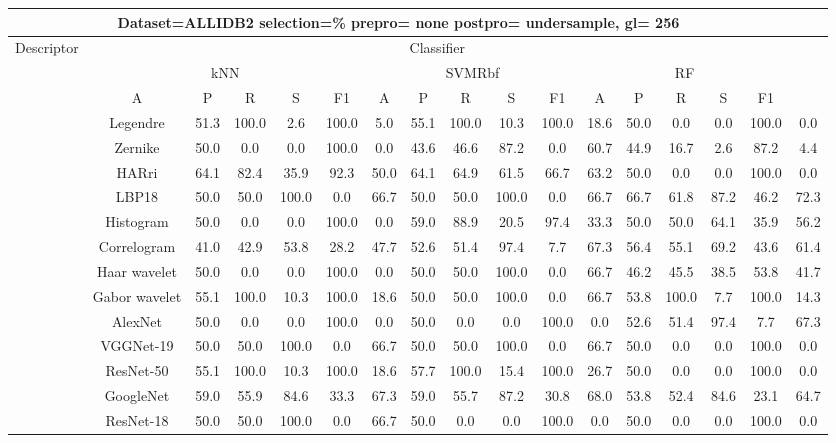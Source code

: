 \documentclass[12pt,italian]{article}
\begin{document}
\begin{tiny}
\begin{longtable}{lcccccccccccccccc}
\toprule
\multicolumn{16}{c}{Dataset=ALLIDB2 selection=\% prepro= none postpro= undersample, gl= 256} \\ 
\toprule
Descriptor & \multicolumn{15}{c}{Classifier} \\ 
& \multicolumn{5}{c}{kNN} & \multicolumn{5}{c}{SVMRbf} & \multicolumn{5}{c}{RF} \\ 
& A & P & R & S & F1 & A & P & R & S & F1 & A & P & R & S & F1 \\ 
\midrule
& Legendre & 51.3 & 100.0 &  2.6 & 100.0 &  5.0 & 55.1 & 100.0 & 10.3 & 100.0 & 18.6 & 50.0 &  0.0 &  0.0 & 100.0 &  0.0 \\ 
& Zernike & 50.0 &  0.0 &  0.0 & 100.0 &  0.0 & 43.6 & 46.6 & 87.2 &  0.0 & 60.7 & 44.9 & 16.7 &  2.6 & 87.2 &  4.4 \\ 
& HARri & 64.1 & 82.4 & 35.9 & 92.3 & 50.0 & 64.1 & 64.9 & 61.5 & 66.7 & 63.2 & 50.0 &  0.0 &  0.0 & 100.0 &  0.0 \\ 
& LBP18 & 50.0 & 50.0 & 100.0 &  0.0 & 66.7 & 50.0 & 50.0 & 100.0 &  0.0 & 66.7 & 66.7 & 61.8 & 87.2 & 46.2 & 72.3 \\ 
& Histogram & 50.0 &  0.0 &  0.0 & 100.0 &  0.0 & 59.0 & 88.9 & 20.5 & 97.4 & 33.3 & 50.0 & 50.0 & 64.1 & 35.9 & 56.2 \\ 
& Correlogram & 41.0 & 42.9 & 53.8 & 28.2 & 47.7 & 52.6 & 51.4 & 97.4 &  7.7 & 67.3 & 56.4 & 55.1 & 69.2 & 43.6 & 61.4 \\ 
& Haar wavelet & 50.0 &  0.0 &  0.0 & 100.0 &  0.0 & 50.0 & 50.0 & 100.0 &  0.0 & 66.7 & 46.2 & 45.5 & 38.5 & 53.8 & 41.7 \\ 
& Gabor wavelet & 55.1 & 100.0 & 10.3 & 100.0 & 18.6 & 50.0 & 50.0 & 100.0 &  0.0 & 66.7 & 53.8 & 100.0 &  7.7 & 100.0 & 14.3 \\ 
& AlexNet & 50.0 &  0.0 &  0.0 & 100.0 &  0.0 & 50.0 &  0.0 &  0.0 & 100.0 &  0.0 & 52.6 & 51.4 & 97.4 &  7.7 & 67.3 \\ 
& VGGNet-19 & 50.0 & 50.0 & 100.0 &  0.0 & 66.7 & 50.0 & 50.0 & 100.0 &  0.0 & 66.7 & 50.0 &  0.0 &  0.0 & 100.0 &  0.0 \\ 
& ResNet-50 & 55.1 & 100.0 & 10.3 & 100.0 & 18.6 & 57.7 & 100.0 & 15.4 & 100.0 & 26.7 & 50.0 &  0.0 &  0.0 & 100.0 &  0.0 \\ 
& GoogleNet & 59.0 & 55.9 & 84.6 & 33.3 & 67.3 & 59.0 & 55.7 & 87.2 & 30.8 & 68.0 & 53.8 & 52.4 & 84.6 & 23.1 & 64.7 \\ 
& ResNet-18 & 50.0 & 50.0 & 100.0 &  0.0 & 66.7 & 50.0 &  0.0 &  0.0 & 100.0 &  0.0 & 50.0 &  0.0 &  0.0 & 100.0 &  0.0 \\ 

\end{longtable}
\end{tiny}
\end{document}
